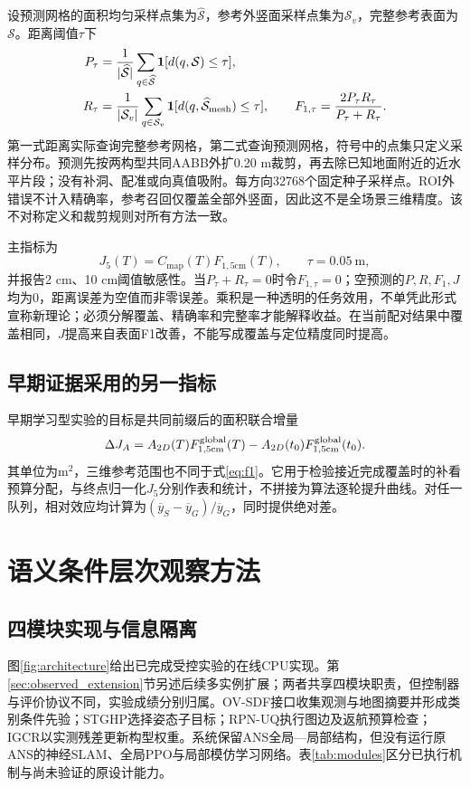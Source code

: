 \documentclass[11pt,a4paper]{article}
\newcommand{\J}{J_{5}}
\newcommand{\C}{C_{\mathrm{map}}}
\newcommand{\F}{F_{1,5\mathrm{cm}}}
\begin{document}
设预测网格的面积均匀采样点集为$\widehat{\mathcal S}$，参考外竖面采样点集为$\mathcal S_v$，完整参考表面为$\mathcal S$。距离阈值$\tau$下
\begin{align}
P_\tau&=\frac{1}{|\widehat{\mathcal S}|}\sum_{q\in\widehat{\mathcal S}}
\mathbf1[d(q,\mathcal S)\le\tau],\\
R_\tau&=\frac{1}{|\mathcal S_v|}\sum_{q\in\mathcal S_v}
\mathbf1[d(q,\widehat{\mathcal S}_{\rm mesh})\le\tau],\qquad
F_{1,\tau}=\frac{2P_\tau R_\tau}{P_\tau+R_\tau}.
\label{eq:f1}
\end{align}
第一式距离实际查询完整参考网格，第二式查询预测网格，符号中的点集只定义采样分布。预测先按两构型共同AABB外扩0.20 m裁剪，再去除已知地面附近的近水平片段；没有补洞、配准或向真值吸附。每方向32768个固定种子采样点。ROI外错误不计入精确率，参考召回仅覆盖全部外竖面，因此这不是全场景三维精度。该不对称定义和裁剪规则对所有方法一致。

主指标为
\begin{equation}
\J(T)=\C(T)\F(T),\qquad \tau=0.05\ \mathrm m,
\label{eq:joint}
\end{equation}
并报告2 cm、10 cm阈值敏感性。当$P_\tau+R_\tau=0$时令$F_{1,\tau}=0$；空预测的$P,R,F_1,J$均为0，距离误差为空值而非零误差。乘积是一种透明的任务效用，不单凭此形式宣称新理论；必须分解覆盖、精确率和完整率才能解释收益。在当前配对结果中覆盖相同，$J$提高来自表面F1改善，不能写成覆盖与定位精度同时提高。

\subsection{早期证据采用的另一指标}
早期学习型实验的目标是共同前缀后的面积联合增量
\begin{equation}
\Delta J_A=A_{2D}(T)F_{1,5\mathrm{cm}}^{\rm global}(T)
-A_{2D}(t_0)F_{1,5\mathrm{cm}}^{\rm global}(t_0).
\label{eq:legacy}
\end{equation}
其单位为m$^2$，三维参考范围也不同于式\eqref{eq:f1}。它用于检验接近完成覆盖时的补看预算分配，与终点归一化$J_5$分别作表和统计，不拼接为算法逐轮提升曲线。对任一队列，相对效应均计算为$(\overline y_S-\overline y_G)/\overline y_G$，同时提供绝对差。

\section{语义条件层次观察方法}
\label{sec:controlled_method}
\subsection{四模块实现与信息隔离}
图\ref{fig:architecture}给出已完成受控实验的在线CPU实现。第\ref{sec:observed_extension}节另述后续多实例扩展；两者共享四模块职责，但控制器与评价协议不同，实验成绩分别归属。OV-SDF接口收集观测与地图摘要并形成类别条件先验；STGHP选择姿态子目标；RPN-UQ执行图边及返航预算检查；IGCR以实测残差更新构型权重。系统保留ANS全局—局部结构，但没有运行原ANS的神经SLAM、全局PPO与局部模仿学习网络。表\ref{tab:modules}区分已执行机制与尚未验证的原设计能力。
\end{document}
